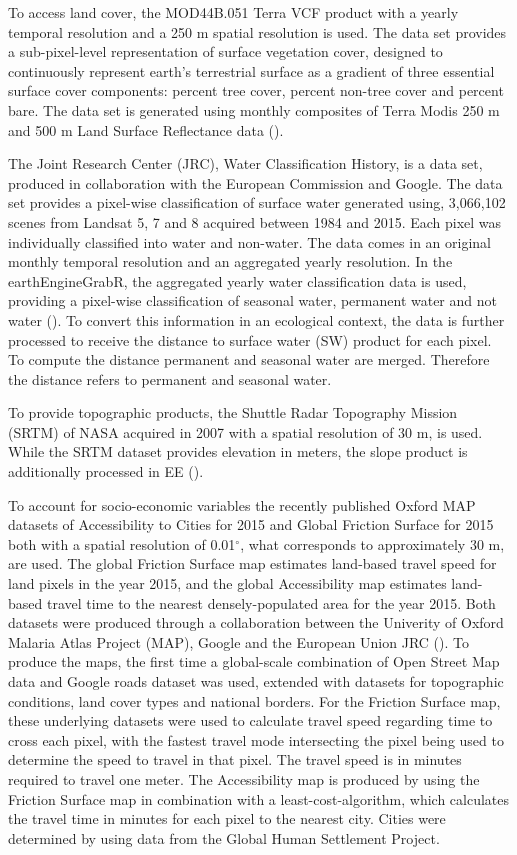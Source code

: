 To access land cover, the MOD44B.051 Terra VCF product with a yearly temporal resolution and a 250 m spatial resolution is used. The data set provides a sub-pixel-level representation of surface vegetation cover, designed to continuously represent earth's terrestrial surface as a gradient of three essential surface cover components: percent tree cover, percent non-tree cover and percent bare. The data set is generated using monthly composites of Terra Modis 250 m and 500 m Land Surface Reflectance data (\cite{hansen2006vegetation}).

The Joint Research Center (JRC), Water Classification History, is a data set, produced in collaboration with the European Commission and Google. 
The data set provides a pixel-wise classification of surface water generated using, 3,066,102 scenes from Landsat 5, 7 and 8 acquired between 1984 and 2015. Each pixel was individually classified into water and non-water. The data comes in an original monthly temporal resolution and an aggregated yearly resolution. In the earthEngineGrabR, the aggregated yearly water classification data is used, providing a pixel-wise classification of seasonal water, permanent water and not water (\cite{pekel2016high}). To convert this information in an ecological context, the data is further processed to receive the distance to surface water (SW) product for each pixel. To compute the distance permanent and seasonal water are merged. Therefore the distance refers to permanent and seasonal water.

To provide topographic products, the Shuttle Radar Topography Mission (SRTM) of NASA acquired in 2007 with a spatial resolution of 30 m, is used. While the SRTM dataset provides elevation in meters, the slope product is additionally processed in EE (\cite{farr2007shuttle}). 

To account for socio-economic variables the recently published Oxford MAP datasets of Accessibility to Cities for 2015 and Global Friction Surface for 2015 both with a spatial resolution of 0.01$^\circ$, what corresponds to approximately 30 m, are used. The global Friction Surface map estimates land-based travel speed for land pixels in the year 2015, and the global Accessibility map estimates land-based travel time to the nearest densely-populated area for the year 2015. Both datasets were produced through a collaboration between the Univerity of Oxford Malaria Atlas Project (MAP), Google and the European Union JRC (\cite{weiss2018global}).
To produce the maps, the first time a global-scale combination of Open Street Map data and Google roads dataset was used, extended with datasets for topographic conditions, land cover types and national borders.
For the Friction Surface map, these underlying datasets were used to calculate travel speed regarding time to cross each pixel, with the fastest travel mode intersecting the pixel being used to determine the speed to travel in that pixel. The travel speed is in minutes required to travel one meter. The Accessibility map is produced by using the Friction Surface map in combination with a least-cost-algorithm, which calculates the travel time in minutes for each pixel to the nearest city. Cities were determined by using data from the Global Human Settlement Project.  

